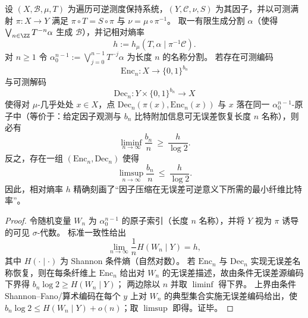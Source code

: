 \begin{theorem}[相对熵率刻画无误差纤维补码的最小比特率]\label{thm:conclusion-relative-entropy-minimal-sidebit-rate}
设 \((X,\mathcal B,\mu,T)\) 为遍历可逆测度保持系统，\((Y,\mathcal C,\nu,S)\) 为其因子，并以可测满射 \(\pi:X\to Y\) 满足 \(\pi\circ T=S\circ \pi\) 与 \(\nu=\mu\circ\pi^{-1}\)。
取一有限生成分割 \(\alpha\)（使得 \(\bigvee_{n\in\ZZ}T^{-n}\alpha\) 生成 \(\mathcal B\)），并记相对熵率
\[
h:=h_\mu(T,\alpha\mid \pi^{-1}\mathcal C).
\]
对 \(n\ge 1\) 令
\(
\alpha^{n-1}_0:=\bigvee_{j=0}^{n-1}T^{-j}\alpha
\)
为长度 \(n\) 的名称分割。
若存在可测编码
\[
\mathrm{Enc}_n:X\to\{0,1\}^{b_n}
\]
与可测解码
\[
\mathrm{Dec}_n:Y\times\{0,1\}^{b_n}\to X
\]
使得对 \(\mu\)-几乎处处 \(x\in X\)，点 \(\mathrm{Dec}_n(\pi(x),\mathrm{Enc}_n(x))\) 与 \(x\) 落在同一 \(\alpha^{n-1}_0\)-原子中（等价于：给定因子观测与 \(b_n\) 比特附加信息可无误差恢复长度 \(n\) 名称），则必有
\[
\liminf_{n\to\infty}\frac{b_n}{n}\ \ge\ \frac{h}{\log 2}.
\]
反之，存在一组 \((\mathrm{Enc}_n,\mathrm{Dec}_n)\) 使得
\[
\limsup_{n\to\infty}\frac{b_n}{n}\ \le\ \frac{h}{\log 2}.
\]
因此，相对熵率 \(h\) 精确刻画了“因子压缩在无误差可逆意义下所需的最小纤维比特率”。
\end{theorem}
\begin{proof}
令随机变量 \(W_n\) 为 \(\alpha^{n-1}_0\) 的原子索引（长度 \(n\) 名称），并将 \(Y\) 视为 \(\pi\) 诱导的可见 \(\sigma\)-代数。
标准一致性给出
\[
\lim_{n\to\infty}\frac{1}{n}H(W_n\mid Y)=h,
\]
其中 \(H(\cdot\mid\cdot)\) 为 Shannon 条件熵（自然对数）。
若 \(\mathrm{Enc}_n\) 与 \(\mathrm{Dec}_n\) 实现无误差名称恢复，则在每条纤维上 \(\mathrm{Enc}_n\) 给出对 \(W_n\) 的无误差描述，故由条件无误差源编码下界得
\(
b_n\log 2\ge H(W_n\mid Y)
\)；
两边除以 \(n\) 并取 \(\liminf\) 得下界。
上界由条件 Shannon--Fano/算术编码在每个 \(y\) 上对 \(W_n\) 的典型集合实施无误差编码给出，使 \(b_n\log 2\le H(W_n\mid Y)+o(n)\)；取 \(\limsup\) 即得。证毕。
\end{proof}

